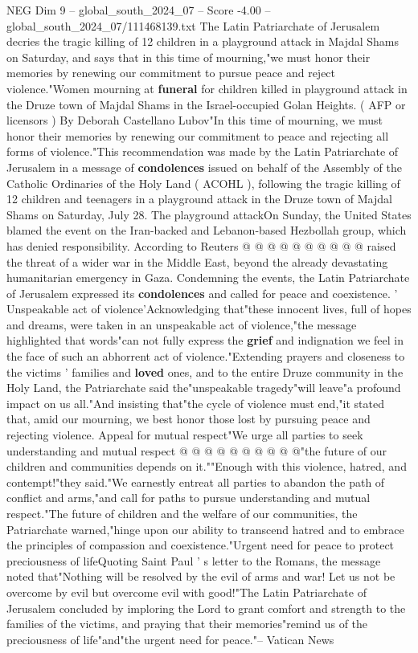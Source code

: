 \begin{textsample}{NEG Dim 9 – global\_south\_2024\_07 – Score -4.00 – global\_south\_2024\_07/111468139.txt}  \label{ex:f9_neg_338}
The Latin Patriarchate of Jerusalem decries the tragic killing of 12 children in a playground attack in Majdal Shams on Saturday, and says that in this time of mourning,"we must honor their memories by renewing our commitment to pursue peace and reject violence."Women mourning at \textbf{funeral} for children killed in playground attack in the Druze town of Majdal Shams in the Israel-occupied Golan Heights. ( AFP or licensors ) By Deborah Castellano Lubov"In this time of mourning, we must honor their memories by renewing our commitment to peace and rejecting all forms of violence."This recommendation was made by the Latin Patriarchate of Jerusalem in a message of \textbf{condolences} issued on behalf of the Assembly of the Catholic Ordinaries of the Holy Land ( ACOHL ), following the tragic killing of 12 children and teenagers in a playground attack in the Druze town of Majdal Shams on Saturday, July 28.
The playground attackOn Sunday, the United States blamed the event on the Iran-backed and Lebanon-based Hezbollah group, which has denied responsibility.
According to Reuters @ @ @ @ @ @ @ @ @ @ raised the threat of a wider war in the Middle East, beyond the already devastating humanitarian emergency in Gaza.
Condemning the events, the Latin Patriarchate of Jerusalem expressed its \textbf{condolences} and called for peace and coexistence. ' Unspeakable act of violence'Acknowledging that"these innocent lives, full of hopes and dreams, were taken in an unspeakable act of violence,"the message highlighted that words"can not fully express the \textbf{grief} and indignation we feel in the face of such an abhorrent act of violence."Extending prayers and closeness to the victims ' families and \textbf{loved} ones, and to the entire Druze community in the Holy Land, the Patriarchate said the"unspeakable tragedy"will leave"a profound impact on us all."And insisting that"the cycle of violence must end,"it stated that, amid our mourning, we best honor those lost by pursuing peace and rejecting violence.
Appeal for mutual respect"We urge all parties to seek understanding and mutual respect @ @ @ @ @ @ @ @ @ @"the future of our children and communities depends on it.""Enough with this violence, hatred, and contempt!"they said."We earnestly entreat all parties to abandon the path of conflict and arms,"and call for paths to pursue understanding and mutual respect."The future of children and the welfare of our communities, the Patriarchate warned,"hinge upon our ability to transcend hatred and to embrace the principles of compassion and coexistence."Urgent need for peace to protect preciousness of lifeQuoting Saint Paul ' s letter to the Romans, the message noted that"Nothing will be resolved by the evil of arms and war!
Let us not be overcome by evil but overcome evil with good!"The Latin Patriarchate of Jerusalem concluded by imploring the Lord to grant comfort and strength to the families of the victims, and praying that their memories"remind us of the preciousness of life"and"the urgent need for peace."-- Vatican News

\end{textsample}
